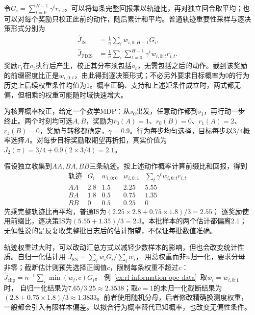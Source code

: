 令$G_i=\sum_{t=0}^{H-1}\gamma^t r_{i,t}$。可以将每条完整回报乘以轨迹比，再对独立回合取平均；也可以对每个奖励只校正此前的动作，随后累计和平均。普通轨迹重要性采样与逐决策形式分别为
\begin{align}
  \label{eq:rl-information-is}
  \widehat J_{\mathrm{IS}}
    &=\frac1n\sum_iw_{i,0:H-1}G_i,\nonumber\\
  \widehat J_{\mathrm{PDIS}}
    &=\frac1n\sum_i\sum_{t=0}^{H-1}
                      \gamma^t w_{i,0:t}r_{i,t}.
\end{align}
奖励$r_t$在$a_t$执行后产生，校正其分布须包括$a_t$，无需包括之后的动作。截到该奖励的前缀密度比正是$w_{i,0:t}$，由此得到逐决策形式；不必另外要求目标概率为0的行为历史上后续权重条件均值为1。概率正确、支持和上述矩条件成立时，两式都无偏，但相乘的权重可能随时域快速增大。

\begin{example}[三条两步轨迹的概率校正]
  \label{ex:rl-information-ope-data}
  为核算概率校正，给定一个教学MDP：从$s_0$出发，任意动作都到$s_1$，再行动一步终止。两个时刻均可选$A,B$，奖励为$r_0(A)=1$、$r_0(B)=0$、$r_1(A)=2$、$r_1(B)=0$，奖励与转移都确定，$\gamma=0.9$。行为每步均匀选择，目标每步以$3/4$概率选择$A$。对每步目标奖励取期望再折扣，真实价值为
  $J_2(\pi)=3/4+0.9(2\times3/4)=2.1$。

  假设独立收集到$AA,BA,BB$三条轨迹。按上述动作概率计算前缀比和回报，得到
  \[
  \begin{array}{c|rrrr}
    \text{轨迹}&G_i&w_{i,0:0}&w_{i,0:1}
                    &\sum_t\gamma^t w_{i,0:t}r_{i,t}\\
    \hline
    AA&2.8&1.5&2.25&5.55\\
    BA&1.8&0.5&0.75&1.35\\
    BB&0&0.5&0.25&0
  \end{array}
  \]
  先乘完整轨迹比再平均，普通IS为$(2.25\times2.8+0.75\times1.8)/3=2.55$；
  逐奖励使用前缀比，逐决策IS为$(5.55+1.35)/3=2.3$。本批样本的两个估计都偏离2.1；无偏性说的是反复收集整批日志后的估计期望，不保证每批数值准确。
\end{example}

轨迹权重过大时，可以改动汇总方式以减轻少数样本的影响，但也会改变统计性质。自归一化估计用
$\widehat J_{\mathrm{SN}}=\sum_iw_iG_i/\sum_iw_i$，
用总权重而非$n$归一化，要求分母非零；截断估计则预先选择正阈值$c$，限制每条权重不超过$c$：
$\widehat J_{\mathrm{clip}}=n^{-1}\sum_i\min(w_i,c)G_i$。
例~\ref{ex:rl-information-ope-data}~取$w_i=w_{i,0:1}$时，
自归一化结果为$7.65/3.25\approx2.3538$；取$c=1$的未归一化截断结果为
$(2.8+0.75\times1.8)/3\approx1.3833$。前者使用随机分母，后者修改精确换测度权重，一般都会引入有限样本偏差。以拟合行为概率替代已知概率，也改变无偏性条件。

